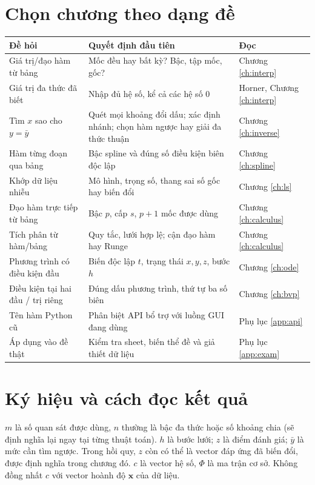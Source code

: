 \clearpage
\section*{Chọn chương theo dạng đề}
\begin{center}\small\begin{tabular}{@{}p{}p{}p{}@{}}
\toprule
Đề hỏi & Quyết định đầu tiên & Đọc\\\midrule
Giá trị/đạo hàm từ bảng & Mốc đều hay bất kỳ? Bậc, tập mốc, gốc? & Chương \ref{ch:interp}\\
Giá trị đa thức đã biết & Nhập đủ hệ số, kể cả các hệ số 0 & Horner, Chương \ref{ch:interp}\\
Tìm $x$ sao cho $y=\bar y$ & Quét mọi khoảng đổi dấu; xác định nhánh; chọn hàm ngược hay giải đa thức thuận & Chương \ref{ch:inverse}\\
Hàm từng đoạn qua bảng & Bậc spline và đúng số điều kiện biên độc lập & Chương \ref{ch:spline}\\
Khớp dữ liệu nhiễu & Mô hình, trọng số, thang sai số gốc hay biến đổi & Chương \ref{ch:ls}\\
Đạo hàm trực tiếp từ bảng & Bậc $p$, cấp $s$, $p+1$ mốc được dùng & Chương \ref{ch:calculus}\\
Tích phân từ hàm/bảng & Quy tắc, lưới hợp lệ; cận đạo hàm hay Runge & Chương \ref{ch:calculus}\\
Phương trình có điều kiện đầu & Biến độc lập $t$, trạng thái $x,y,z$, bước $h$ & Chương \ref{ch:ode}\\
Điều kiện tại hai đầu / trị riêng & Đúng dấu phương trình, thứ tự ba số biên & Chương \ref{ch:bvp}\\
Tên hàm Python cũ & Phân biệt API bổ trợ với luồng GUI đang dùng & Phụ lục \ref{app:api}\\
Áp dụng vào đề thật & Kiểm tra sheet, biến thể đề và giả thiết dữ liệu & Phụ lục \ref{app:exam}\\
\bottomrule
\end{tabular}\end{center}

\section*{Ký hiệu và cách đọc kết quả}
$m$ là số quan sát được dùng, $n$ thường là bậc đa thức hoặc số khoảng chia (sẽ định nghĩa lại ngay tại từng thuật toán). $h$ là bước lưới; $z$ là điểm đánh giá; $\bar y$ là mức cần tìm ngược. Trong hồi quy, $z$ còn có thể là vector đáp ứng đã biến đổi, được định nghĩa trong chương đó. $c$ là vector hệ số, $\Phi$ là ma trận cơ sở. Không đồng nhất $c$ với vector hoành độ $\mathbf{x}$ của dữ liệu.

